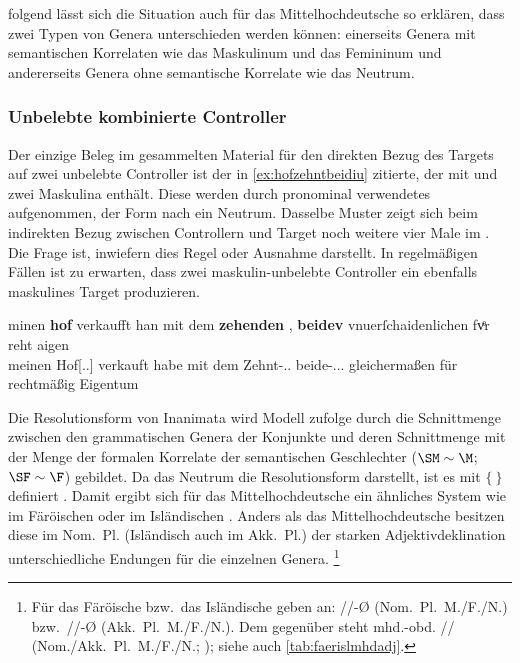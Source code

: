 \textcites[576]{wechsler2009}[182]{wechslerzlatic2003} folgend lässt sich die
Situation auch für das Mittelhochdeutsche so erklären, dass zwei Typen von
Genera unterschieden werden können: einerseits Genera mit semantischen
Korrelaten wie das Maskulinum und das Femininum und andererseits Genera ohne
semantische Korrelate wie das Neutrum.

\subsubsection{Unbelebte kombinierte Controller}
\label{subsubsec:x+x_dir_inan}

Der einzige Beleg im gesammelten Material für den direkten Bezug des Targets
auf zwei unbelebte Controller ist der in \cref{ex:hofzehntbeidiu} zitierte, der
mit   und   zwei Maskulina
enthält. Diese werden durch pronominal verwendetes  aufgenommen,
der Form nach ein Neutrum. Dasselbe Muster zeigt sich beim indirekten Bezug
zwischen Controllern und Target noch weitere vier Male im . Die
Frage ist, inwiefern dies Regel oder Ausnahme darstellt. In regelmäßigen Fällen
ist zu erwarten, dass zwei maskulin-unbelebte Controller ein ebenfalls
maskulines Target produzieren.

\begin{exe}
\ex\label{ex:hofzehntbeidiu}
	\gll minen \textbf{hof} \textelp{} verkaufft han mit dem
			\textbf{zehenden} \textelp{}, \textbf{beidev} vnuerſchaidenlichen
			fvͤr reht aigen \\
			meinen Hof[\Acc.\Sg.\MascI] {} verkauft habe mit dem
			Zehnt-\Dat.\Sg.\MascI{} {} beide-\Acc.\Pl.\NeutI.\St{}
			gleichermaßen für rechtmäßig Eigentum \\
	\begin{taggedline}{\parencites(Augsburg, 1283)[\pno~N~241, 195.37--39]{cao5}}
	\trans {}
	\end{taggedline}
\end{exe}

Die Resolutionsform von Inanimata wird  Modell
zufolge durch die Schnittmenge zwischen den grammatischen Genera der Konjunkte
und deren Schnittmenge mit der Menge der formalen Korrelate der semantischen
Geschlechter ($\SM \sim \M$; $\SF \sim \F$) gebildet. Da das Neutrum die
Resolutionsform darstellt, ist es mit $\{\ \}$ definiert
\autocites[vgl.][576--578]{wechsler2009}[184--186]{wechslerzlatic2003}. Damit
ergibt sich für das Mittelhochdeutsche ein ähnliches System wie im Färöischen
oder im Isländischen
\autocites(vgl.~\cref{ex:iclgr,fig:iclgr})[225--226]{thrainsson2004}{wechsler2009}.
Anders als das Mittelhochdeutsche besitzen diese im Nom.~Pl. (Isländisch auch
im Akk.~Pl.) der starken Adjektivdeklination unterschiedliche Endungen für die
einzelnen Genera.%
%
	\footnote{Für das Färöische bzw.\ das Isländische geben
		\textcites[100--101]{thrainsson2004}[84--90]{kress1982} an:
		//-Ø (Nom.~Pl.~M./F./N.) bzw.\ //-Ø
		(Akk.~Pl.~M./F./N.). Dem gegenüber steht mhd.-obd.
		\fw{-e}// (Nom./Akk.~Pl.~M./F./N.;
		\cite[182--183]{ksw2}); siehe auch \cref{tab:faerislmhdadj}.%
	}


